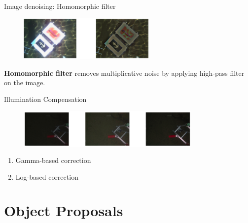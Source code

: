 \documentclass[14pt]{beamer}
\begin{document}
\begin{frame}{Image denoising: Homomorphic filter}

  \begin{figure}[ht]
      \centering
      \includegraphics[width=0.6\textwidth, height=0.3\textwidth]{figs/homomorphic.png}
  \end{figure}

  \textbf{Homomorphic filter} removes multiplicative noise by applying high-pass
  filter on the image.

\end{frame}

\begin{frame}{Illumination Compensation}

  \begin{figure}[ht]
      \centering
      \includegraphics[width=0.8\textwidth, height=0.3\textwidth]{figs/illumination_compensation.png}
  \end{figure}

  \begin{enumerate}
    \item Gamma-based correction
    \item Log-based correction
  \end{enumerate}
\end{frame}

\section{Object Proposals}
\end{document}

